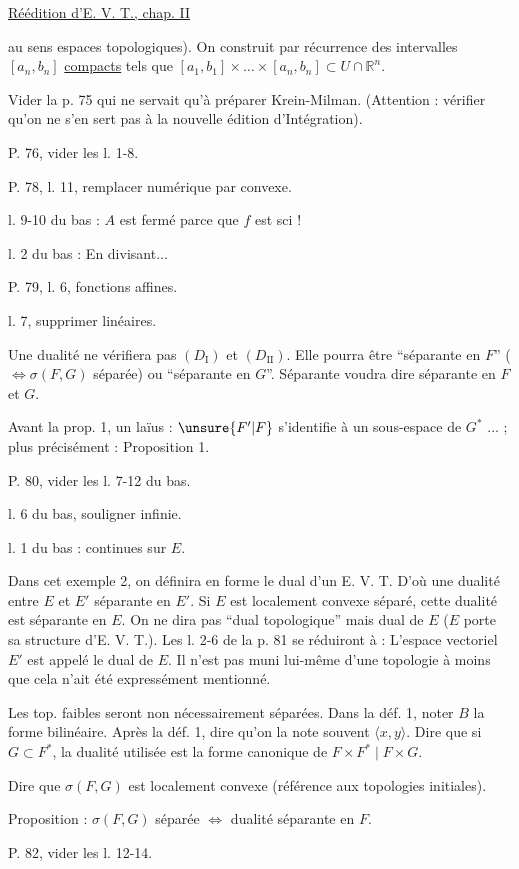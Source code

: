 \uline{Réédition d'E. V. T., chap. II} 

au sens espaces topologiques). On construit par récurrence des intervalles $[a_n,b_n]$ \uline{compacts} tels que $[a_1,b_1]\times\ldots\times[a_n,b_n]\subset U\cap\mathbb{R}^n$.

Vider la p. 75 qui ne servait qu'à préparer Krein-Milman. (Attention : vérifier qu'on ne s'en sert pas à la nouvelle édition d'Intégration).

P. 76, vider les l. 1-8.

P. 78, l. 11, remplacer numérique par convexe.

l. 9-10 du bas : $A$ est fermé parce que $f$ est sci !

l. 2 du bas : En divisant$\ldots$

P. 79, l. 6, fonctions affines.

l. 7, supprimer linéaires.

Une dualité ne vérifiera pas $(D_{\mathrm{I}})$ et $(D_{\mathrm{II}})$. Elle pourra être ``séparante en $F$'' ($\Longleftrightarrow\sigma(F,G)$ séparée) ou ``séparante en $G$''. Séparante voudra dire séparante en $F$ et $G$.

Avant la prop. 1, un laïus : $\unsure{F'|F}$ s'identifie à un sous-espace de $G^*$ $\ldots$ ; plus précisément : Proposition 1.

P. 80, vider les l. 7-12 du bas.

l. 6 du bas, souligner infinie.

l. 1 du bas : continues sur $E$.

Dans cet exemple 2, on définira en forme le dual d'un E. V. T. D'où une dualité entre $E$ et $E'$ séparante en $E'$. Si $E$ est localement convexe séparé, cette dualité est séparante en $E$. On ne dira pas ``dual topologique'' mais dual de $E$ ($E$ porte sa structure d'E. V. T.). Les l. 2-6 de la p. 81 se réduiront à : L'espace vectoriel $E'$ est appelé le dual de $E$. Il n'est pas muni lui-même d'une topologie à moins que cela n'ait été expressément mentionné.

Les top. faibles seront non nécessairement séparées. Dans la déf. 1, noter $B$ la forme bilinéaire. Après la déf. 1, dire qu'on la note souvent $\langle x,y\rangle$. Dire que si $G\subset F^*$, la dualité utilisée est la forme canonique de $F\times F^*\mid F\times G$.

Dire que $\sigma(F,G)$ est localement convexe (référence aux topologies initiales).

Proposition : $\sigma(F,G)$ séparée $\Longleftrightarrow$ dualité séparante en $F$.

P. 82, vider les l. 12-14.
